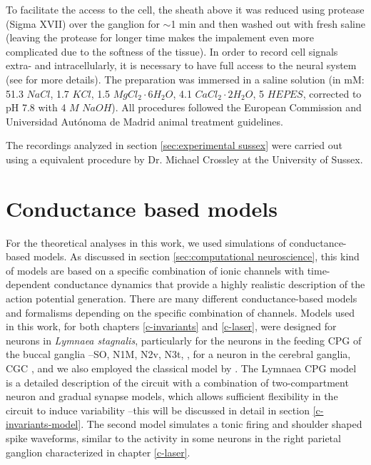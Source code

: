 To facilitate the access to the cell, the sheath above it was reduced using protease (Sigma XVII) over the ganglion for $\sim$1 min and then washed out with fresh saline (leaving the protease for longer time makes the impalement even more complicated due to the softness of the tissue). In order to record cell signals extra- and intracellularly, it is necessary to have full access to the neural system (see \cite{garrido-pena_tfm_2022} for more details). The preparation was immersed in a saline solution (in mM: 51.3 $NaCl$, 1.7 $KCl$, 1.5 $MgCl_2\cdot6H_2O$, 4.1 $CaCl_2\cdot2H_2O$, 5 $HEPES$, corrected to pH 7.8 with 4 $M$ $NaOH$). All procedures followed the European Commission and Universidad Autónoma de Madrid animal treatment guidelines.

The recordings analyzed in section \ref{sec:experimental sussex} were carried out using a equivalent procedure by Dr. Michael Crossley at the University of Sussex. 


\section{Conductance based models}
For the theoretical analyses in this work, we used simulations of conductance-based models. As discussed in section \ref{sec:computational neuroscience}, this kind of models are based on a specific combination of ionic channels with time-dependent conductance dynamics that provide a highly realistic description of the action potential generation. There are many different conductance-based models and formalisms depending on the specific combination of channels. Models used in this work, for both chapters \ref{c-invariants} and \ref{c-laser}, were designed for  neurons in \textit{Lymnaea stagnalis}, particularly for the neurons in the feeding CPG of the buccal ganglia --SO, N1M, N2v, N3t, \parencite{vavoulis_dynamic_2007}, for a neuron in the cerebral ganglia, CGC \parencite{vavoulis_balanced_2010}, and we also employed  the classical model by \textcite{hodgkin_quantitative_1952}. The Lymnaea CPG model is a detailed description of the circuit with a combination of two-compartment neuron and  gradual synapse models, which allows sufficient flexibility in the circuit to induce variability  --this will be discussed in detail in section \ref{c-invariants-model}. The second model simulates a tonic firing and shoulder shaped spike waveforms, similar to the activity in some neurons in the right parietal ganglion characterized in chapter \ref{c-laser}.

